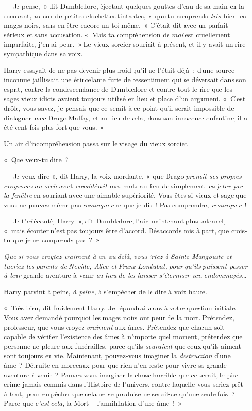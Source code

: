 --- Je pense,~» dit Dumbledore, éjectant quelques gouttes d'eau de sa main en la secouant, au son de petites clochettes tintantes, «~que tu comprends \emph{très} bien les mages noirs, sans en être encore un toi-même.~» C'était dit avec un parfait sérieux et sans accusation. «~Mais ta compréhension de \emph{moi} est cruellement imparfaite, j'en ai peur.~» Le vieux sorcier souriait à présent, et il y avait un rire sympathique dans sa voix.

Harry essayait de ne pas devenir plus froid qu'il ne l'était déjà~; d'une source inconnue jaillissait une étincelante furie de ressentiment qui se déversait dans son esprit, contre la condescendance de Dumbledore et contre tout le rire que les sages vieux idiots avaient toujours utilisé en lieu et place d'un argument. «~C'est drôle, vous savez, je pensais que ce serait à ce point qu'il serait impossible de dialoguer avec Drago Malfoy, et au lieu de cela, dans son innocence enfantine, il a été cent fois plus fort que vous.~»

Un air d'incompréhension passa sur le visage du vieux sorcier.

«~Que veux-tu dire~?

--- Je veux dire~», dit Harry, la voix mordante, «~que Drago \emph{prenait ses propres croyances au sérieux} et \emph{considérait} mes mots au lieu de simplement les \emph{jeter par la fenêtre} en souriant avec une aimable supériorité. Vous êtes si vieux et sage que vous ne pouvez même pas \emph{remarquer} ce que je dis~! Pas comprendre, \emph{remarquer}~!

--- Je t'\emph{ai} écouté, Harry~», dit Dumbledore, l'air maintenant plus solennel, «~mais écouter n'est pas toujours être d'accord. Désaccords mis à part, que crois-tu que je ne comprends pas~?~»

\emph{Que si vous croyiez vraiment à un au-delà, vous iriez à Sainte Mangouste et tueriez les parents de Neville, Alice et Frank Londubat, pour qu'ils puissent passer à leur} grande aventure à venir \emph{au lieu de les laisser s'éterniser ici, endommagés…}

Harry parvint à peine, \emph{à peine}, à s'empêcher de le dire à voix haute.

«~Très bien, dit froidement Harry. Je répondrai alors à votre question initiale. Vous avez demandé pourquoi les mages noirs ont peur de la mort. Prétendez, professeur, que vous croyez \emph{vraiment} aux âmes. Prétendez que chacun soit capable de vérifier l'existence des âmes à n'importe quel moment, prétendez que personne ne pleure aux funérailles, parce qu'ils \emph{sauraient} que ceux qu'ils aiment sont toujours en vie. Maintenant, pouvez-vous imaginer la \emph{destruction} d'une âme~? Détruite en morceaux pour que rien n'en reste pour vivre sa grande aventure à venir~? Pouvez-vous imaginer la chose horrible que ce serait, le pire crime jamais commis dans l'Histoire de l'univers, contre laquelle vous seriez prêt à tout, pour empêcher que cela ne se produise ne serait-ce qu'une seule fois~? Parce que \emph{c'est cela}, la Mort -- l'annihilation d'une âme~!~»

